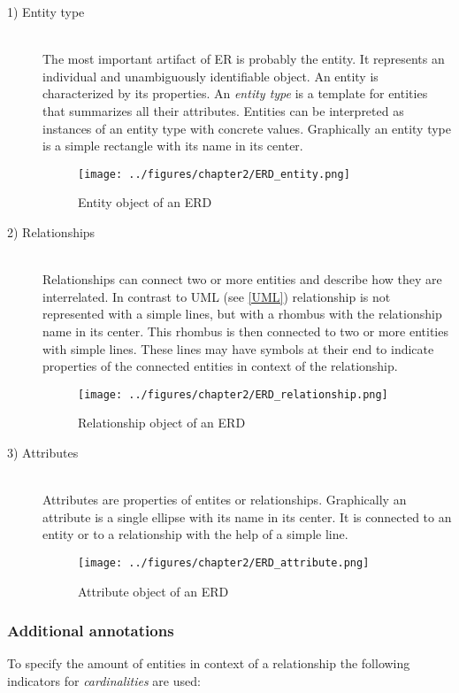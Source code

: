 \documentclass[twoside, openright, 12pt]{book}
\begin{document}
\begin{description}
\item[1) Entity type]\hfill \\
The most important artifact of ER is probably the entity.
It represents an individual and unambiguously identifiable object.
An entity is characterized by its properties.
An \textit{entity type} is a template for entities that summarizes all their attributes.
Entities can be interpreted as instances of an entity type with concrete values.
Graphically an entity type is a simple rectangle with its name in its center.

\begin{figure}[htb]
	\centering
	\texttt{[image: ../figures/chapter2/ERD\_entity.png]}
	\caption{Entity object of an ERD}
	\label{fig:ERD_entity}
\end{figure}

\item[2) Relationships]\hfill \\
Relationships can connect two or more entities and describe how they are interrelated.
In contrast to UML (see \ref{UML}) relationship is not represented with a simple lines, but with a rhombus with the relationship name in its center.
This rhombus is then connected to two or more entities with simple lines.
These lines may have symbols at their end to indicate properties of the connected entities in context of the relationship.

\begin{figure}[htb]
	\centering
	\texttt{[image: ../figures/chapter2/ERD\_relationship.png]}
	\caption{Relationship object of an ERD}
	\label{fig:ERD_relationship}
\end{figure}

\item[3) Attributes]\hfill \\
Attributes are properties of entites or relationships.
Graphically an attribute is a single ellipse with its name in its center.
It is connected to an entity or to a relationship with the help of a simple line.

\begin{figure}[htb]
	\centering
	\texttt{[image: ../figures/chapter2/ERD\_attribute.png]}
	\caption{Attribute object of an ERD}
	\label{fig:ERD_}
\end{figure}
\end{description}

\subsubsection{Additional annotations}
To specify the amount of entities in context of a relationship the following indicators for \textit{cardinalities} are used:
\end{document}
